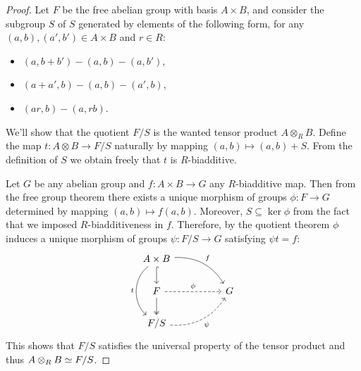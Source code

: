 \begin{proof}
Let \(F\) be the free abelian group with basis \(A \times B\), and consider the
subgroup \(S\) of \(S\) generated by elements of the following form, for any
\((a, b), (a', b') \in A \times B\) and \(r \in R\):
\begin{itemize}\setlength\itemsep{0em}
\item \((a, b + b') - (a, b) - (a, b')\),
\item \((a + a', b) - (a, b) - (a', b)\),
\item \((a r, b) - (a, r b)\).
\end{itemize}
We'll show that the quotient \(F/S\) is the wanted tensor product
\(A \otimes_R B\). Define the map \(t: A \otimes B \to F/S\)
naturally by mapping \((a, b) \mapsto (a, b) + S\). From the definition of
\(S\) we obtain freely that \(t\) is \(R\)-biadditive.

Let \(G\) be any abelian group and \(f: A \times B \to G\) any \(R\)-biadditive
map. Then from the free group theorem there exists a unique morphism of groups
\(\phi: F \to G\) determined by mapping \((a, b) \mapsto f(a, b)\). Moreover,
\(S \subseteq \ker \phi\) from the fact that we imposed \(R\)-biadditiveness in
\(f\). Therefore, by the quotient theorem \(\phi\) induces a unique morphism of
groups \(\psi: F/S \to G\) satisfying \(\psi t = f\):
\[
\begin{tikzcd}
A \times B \ar[rrd, bend left, "f"]
\ar[d, hook]
\ar[dd, bend right=50, "t"']
&&\\
F \ar[rr, dashed, "\phi"]
\ar[d, two heads]
&&G \\
F/S \ar[rru, bend right, "\psi"', dashed]
&&
\end{tikzcd}
\]
This shows that \(F/S\) satisfies the universal property of the tensor product
and thus \(A \otimes_R B \simeq F/S\).
\end{proof}

